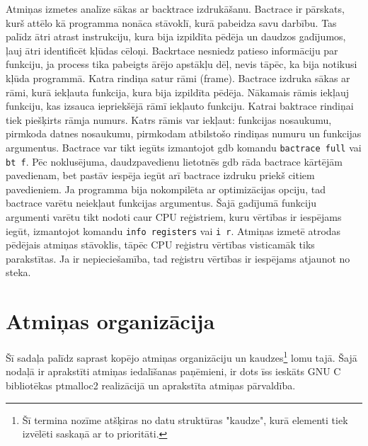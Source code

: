 Atmiņas izmetes analīze sākas ar backtrace izdrukāšanu. 
Bactrace ir pārskats, kurš attēlo kā programma nonāca stāvoklī, kurā pabeidza savu darbību.
Tas palīdz ātri atrast instrukciju, kura bija izpildīta pēdēja un daudzos gadījumos, ļauj ātri identificēt kļūdas cēloņi.
Backrtace nesniedz patieso informāciju par funkciju, ja process tika pabeigts ārējo apstākļu dēļ, nevis tāpēc, ka bija notikusi kļūda programmā.
Katra rindiņa satur rāmi (frame). Bactrace izdruka sākas ar rāmi, kurā iekļauta funkcija, kura bija izpildīta pēdēja. 
Nākamais rāmis iekļauj funkciju, kas izsauca iepriekšējā rāmī iekļauto funkciju.
Katrai baktrace rindiņai tiek piešķirts rāmja numurs. Katrs rāmis var iekļaut: funkcijas nosaukumu, pirmkoda datnes nosaukumu, pirmkodam atbilstošo rindiņas numuru un funkcijas argumentus. 
Bactrace var tikt iegūts izmantojot gdb komandu \texttt{bactrace full} vai \texttt{bt f}. 
Pēc noklusējuma, daudzpavedienu lietotnēs gdb  rāda bactrace kārtējām pavedienam, bet pastāv iespēja iegūt arī bactrace izdruku priekš citiem pavedieniem.
Ja programma bija nokompilēta ar optimizācijas opciju, tad bactrace varētu neiekļaut funkcijas argumentus.
Šajā gadījumā funkciju argumenti varētu tikt nodoti caur CPU reģistriem, kuru vērtības ir iespējams iegūt, izmantojot komandu \texttt{info registers} vai \texttt{i r}.
Atmiņas izmetē atrodas pēdējais atmiņas stāvoklis, tāpēc CPU reģistru vērtības visticamāk tiks parakstītas.
 Ja ir nepieciešamība, tad reģistru vērtības ir iespējams atjaunot no steka.







\section{Atmiņas organizācija}

Šī sadaļa palīdz saprast kopējo atmiņas organizāciju un kaudzes\footnote{Šī termina nozīme atšķiras no datu struktūras "kaudze", kurā elementi tiek izvēlēti saskaņā ar to prioritāti.} lomu tajā. 
Šajā nodaļā ir aprakstīti atmiņas iedalīšanas paņēmieni, ir dots īss ieskāts GNU C bibliotēkas ptmalloc2 realizācijā un aprakstīta atmiņas pārvaldība.

